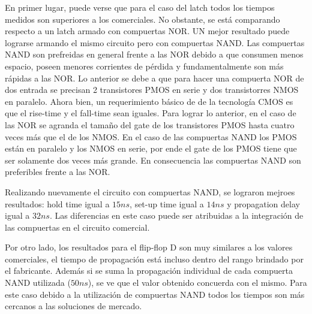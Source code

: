 En primer lugar, puede verse que para el caso del latch todos los tiempos medidos son superiores a los comerciales. No obstante, se está comparando respecto a un latch armado con compuertas NOR. UN mejor resultado puede lograrse armando el mismo circuito pero con compuertas NAND. Las compuertas NAND son prefreidas en general frente a las NOR debido a que consumen menos espacio, poseen menores corrientes de pérdida y fundamentalmente son más rápidas a las NOR. Lo anterior se debe a que para hacer una compuerta NOR de dos entrada se precisan 2 transistores PMOS en serie y dos transistorres NMOS en paralelo. Ahora bien, un requerimiento básico de de la tecnología CMOS es que el rise-time y el fall-time sean iguales. Para lograr lo anterior, en el caso de las NOR se agranda el tamaño del gate de los transistores PMOS hasta cuatro veces más que el de los NMOS. En el caso de las compuertas NAND los PMOS están en paralelo y los NMOS en serie, por ende el gate de los PMOS tiene que ser solamente dos veces más grande. En consecuencia las compuertas NAND son preferibles frente a las NOR. 



Realizando nuevamente el circuito con compuertas NAND, se lograron mejroes resultados: hold time igual a $15ns$, set-up time igual a $14ns$ y propagation delay igual a $32ns$. Las diferencias en este caso puede ser atribuidas a la integración de las compuertas en el circuito comercial. 



Por otro lado, los resultados para el flip-flop D son muy similares a los valores comerciales, el tiempo de propagación está incluso dentro del rango brindado por el fabricante. Además si se suma la propagación individual de cada compuerta NAND utilizada ($50ns$), se ve que el valor obtenido concuerda con el mismo. Para este caso debido a la utilización de compuertas NAND todos los tiempos son más cercanos a las soluciones de mercado. 